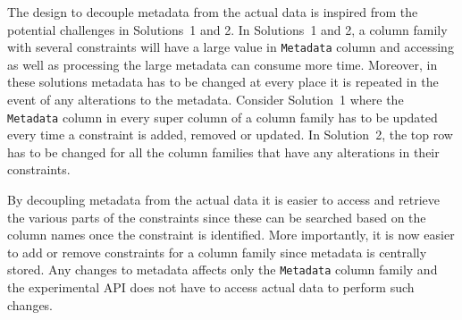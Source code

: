 The design to decouple metadata from the actual data is inspired from the
potential challenges in Solutions~1 and 2. 
In Solutions~1 and 2,   a column family with several constraints will have a
large value in \texttt{Metadata} column and accessing as well as processing the
large metadata can consume more time.  Moreover,  in these solutions metadata has
to be changed at every place it is repeated in the event of any alterations to
the metadata. 
Consider Solution~1 where the \texttt{Metadata} column in every super column
of a column family has to be updated every time a constraint is added,  removed
or updated. 
In Solution~2,  the top row has to be changed for all the column families that have
any alterations  in their constraints.   

By decoupling metadata from the actual
data it is  easier to access and retrieve the various parts of the constraints
since these can be searched based on the column names once the constraint is
identified. 
More importantly,  it is now easier to add or remove constraints for a column
family since metadata  is centrally stored.  Any changes to metadata affects
only the \texttt{Metadata} column family and the experimental \ac{API} does not
have to access actual data to perform such changes. 
